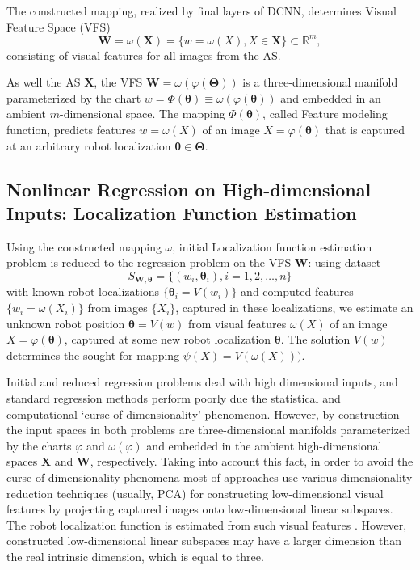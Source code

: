 \documentclass[conference]{IEEEtran} %
\def\mbW{\mathbf{W}}
\def\mbTheta{{\bm\Theta}}
\def\mbtheta{{\bm\theta}}
\def\mbX{\mathbf{X}}
\def\RR{\mathbb{R}}
\begin{document}
The constructed mapping, realized by final layers of DCNN, determines Visual Feature Space (VFS)
\begin{equation}
  \label{eq4}
  \mbW = \omega(\mbX) = \{w =\omega(X), X \in \mbX\} \subset \RR^m,
\end{equation}
consisting of visual features for all images from the AS.

As well the AS $\mbX$, the VFS $\mbW = \omega(\varphi(\mbTheta))$ is a three-dimensional manifold parameterized by the chart $w = \Phi(\mbtheta)  \equiv \omega(\varphi(\mbtheta))$ and embedded in an ambient $m$-dimensional space. The mapping $\Phi(\mbtheta)$, called Feature modeling function, predicts features $w = \omega(X)$ of an image $X = \varphi(\mbtheta)$ that is captured at an arbitrary robot localization $\mbtheta \in \mbTheta$.

\subsection{Nonlinear Regression on High-dimensional Inputs: Localization Function Estimation}
\label{sec3.2}

Using the constructed mapping $\omega$, initial Localization function estimation problem is reduced to the regression problem on the VFS $\mbW$: using dataset
\begin{equation}
  \label{eq5}
  S_{\mathbf{W},\mbtheta} = \{(w_i, \mbtheta_i), i=1,2, \dots, n\}
\end{equation}
with known robot localizations $\{\mbtheta_i = V(w_i)\}$ and computed features $\{w_i = \omega(X_i)\}$ from  images $\{X_i\}$, captured in these localizations, we estimate an unknown robot position $\mbtheta = V(w)$ from visual features $\omega(X)$ of an image $X = \varphi(\mbtheta)$, captured at some new robot localization $\mbtheta$. The solution $V(w)$ determines the sought-for mapping $\psi(X) = V(\omega(X)))$.

Initial and reduced regression problems deal with high dimensional inputs, and standard regression methods perform poorly due the statistical and computational `curse of dimensionality' phenomenon. However, by construction the input spaces in both problems are three-dimensional manifolds parameterized by the charts $\varphi$  and $\omega(\varphi)$ and embedded in the ambient high-dimensional spaces $\mbX$ and $\mbW$, respectively. Taking into account this fact, in order to avoid the curse of dimensionality phenomena most of approaches use various dimensionality reduction techniques (usually, PCA) for constructing low-dimensional visual features by projecting captured images onto low-dimensional linear subspaces. The robot localization function is estimated from such visual features \cite{bib11,bib13,bib14}. However, constructed low-dimensional linear subspaces may have a larger dimension than the real intrinsic dimension, which is equal to three.
\end{document}
